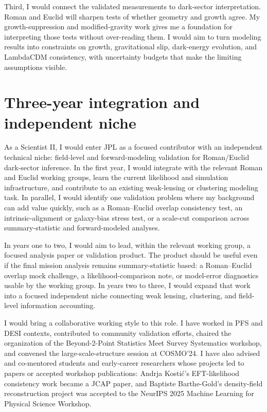 \documentclass[11pt,letterpaper,sans]{moderncv}
\begin{document}
Third, I would connect the validated measurements to dark-sector interpretation. Roman and Euclid will sharpen tests of whether geometry and growth agree. My growth-suppression and modified-gravity work gives me a foundation for interpreting those tests without over-reading them. I would aim to turn modeling results into constraints on growth, gravitational slip, dark-energy evolution, and LambdaCDM consistency, with uncertainty budgets that make the limiting assumptions visible.

\section{Three-year integration and independent niche}
As a Scientist II, I would enter JPL as a focused contributor with an independent technical niche: field-level and forward-modeling validation for Roman/Euclid dark-sector inference. In the first year, I would integrate with the relevant Roman and Euclid working groups, learn the current likelihood and simulation infrastructure, and contribute to an existing weak-lensing or clustering modeling task. In parallel, I would identify one validation problem where my background can add value quickly, such as a Roman--Euclid overlap consistency test, an intrinsic-alignment or galaxy-bias stress test, or a scale-cut comparison across summary-statistic and forward-modeled analyses.

In years one to two, I would aim to lead, within the relevant working group, a focused analysis paper or validation product. The product should be useful even if the final mission analysis remains summary-statistic based: a Roman--Euclid overlap mock challenge, a likelihood-comparison note, or model-error diagnostics usable by the working group. In years two to three, I would expand that work into a focused independent niche connecting weak lensing, clustering, and field-level information accounting.

I would bring a collaborative working style to this role. I have worked in PFS and DESI contexts, contributed to community validation efforts, chaired the organization of the Beyond-2-Point Statistics Meet Survey Systematics workshop, and convened the large-scale-structure session at COSMO'24. I have also advised and co-mentored students and early-career researchers whose projects led to papers or accepted workshop publications: Andrja Kosti\'c's EFT-likelihood consistency work became a JCAP paper, and Baptiste Barthe-Gold's density-field reconstruction project was accepted to the NeurIPS 2025 Machine Learning for Physical Science Workshop.
\end{document}
